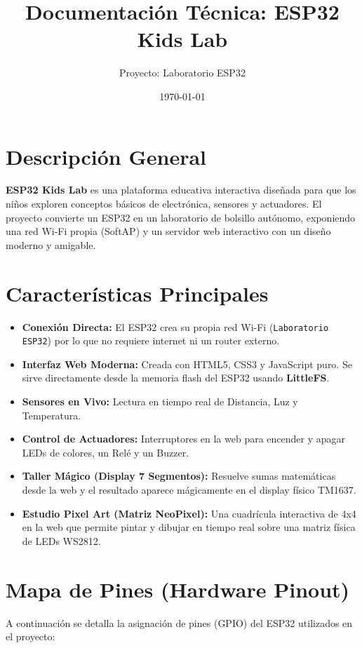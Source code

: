 \documentclass[12pt,a4paper]{article}
\title{\textbf{Documentación Técnica: ESP32 Kids Lab}}
\author{Proyecto: Laboratorio ESP32}
\date{\today}
\begin{document}
\maketitle

\section{Descripción General}
\textbf{ESP32 Kids Lab} es una plataforma educativa interactiva diseñada para que los niños exploren conceptos básicos de electrónica, sensores y actuadores. El proyecto convierte un ESP32 en un laboratorio de bolsillo autónomo, exponiendo una red Wi-Fi propia (SoftAP) y un servidor web interactivo con un diseño moderno y amigable.

\section{Características Principales}
\begin{itemize}
    \item \textbf{Conexión Directa:} El ESP32 crea su propia red Wi-Fi (\texttt{Laboratorio ESP32}) por lo que no requiere internet ni un router externo.
    \item \textbf{Interfaz Web Moderna:} Creada con HTML5, CSS3 y JavaScript puro. Se sirve directamente desde la memoria flash del ESP32 usando \textbf{LittleFS}.
    \item \textbf{Sensores en Vivo:} Lectura en tiempo real de Distancia, Luz y Temperatura.
    \item \textbf{Control de Actuadores:} Interruptores en la web para encender y apagar LEDs de colores, un Relé y un Buzzer.
    \item \textbf{Taller Mágico (Display 7 Segmentos):} Resuelve sumas matemáticas desde la web y el resultado aparece mágicamente en el display físico TM1637.
    \item \textbf{Estudio Pixel Art (Matriz NeoPixel):} Una cuadrícula interactiva de 4x4 en la web que permite pintar y dibujar en tiempo real sobre una matriz física de LEDs WS2812.
\end{itemize}

\section{Mapa de Pines (Hardware Pinout)}

A continuación se detalla la asignación de pines (GPIO) del ESP32 utilizados en el proyecto:
\end{document}

